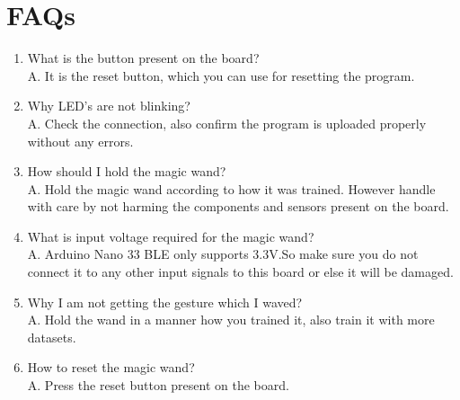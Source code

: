 %
%



\chapter{FAQs} 
\begin{enumerate}
	
	\item What is the button present on the board?\\

	A. It is the reset button, which you can use for resetting the program. \\

	\item Why LED's are not blinking?\\
	
	A. Check the connection, also confirm the program is uploaded properly without any errors.\\
	
		\item How should I hold the magic wand?\\
	
	A. Hold the magic wand according to how it was trained. However handle with care by not harming the components and sensors present on the board.\\
	
	\item What is input voltage required for the magic wand?\\
	
	A. Arduino Nano 33 BLE only supports 3.3V.So make sure you do not connect it to any other input signals to this board or else it will be damaged. \\
	
		\item Why I am not getting the gesture which I waved?\\
	
	A. Hold the wand in a manner how you trained it, also train it with more datasets.\\
	
	
		\item How to reset the magic wand?\\
	
	A. Press the reset button present on the board. \\
	

\end{enumerate}
